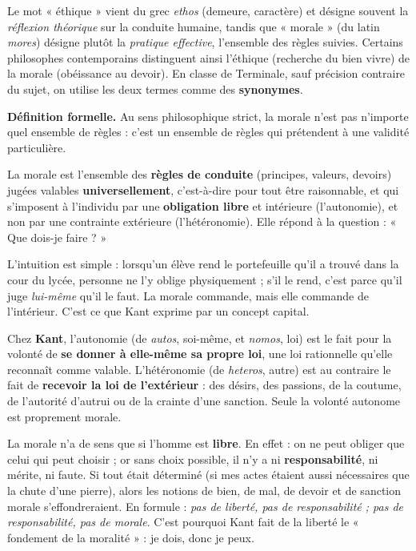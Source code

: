 \documentclass[11pt]{article}
\newcommand{\cle}[1]{{\popxbold\color{popdark}#1}}
\begin{document}
\begin{savaistu}
Le mot « éthique » vient du grec \emph{ethos} (demeure, caractère) et désigne souvent la \emph{réflexion théorique} sur la conduite humaine, tandis que « morale » (du latin \emph{mores}) désigne plutôt la \emph{pratique effective}, l'ensemble des règles suivies. Certains philosophes contemporains distinguent ainsi l'éthique (recherche du bien vivre) de la morale (obéissance au devoir). En classe de Terminale, sauf précision contraire du sujet, on utilise les deux termes comme des \textbf{synonymes}.
\end{savaistu}

\textbf{Définition formelle.} Au sens philosophique strict, la morale n'est pas n'importe quel ensemble de règles : c'est un ensemble de règles qui prétendent à une validité particulière.

\begin{definition}[La morale]
La \cle{morale} est l'ensemble des \textbf{règles de conduite} (principes, valeurs, devoirs) jugées valables \textbf{universellement}, c'est-à-dire pour tout être raisonnable, et qui s'imposent à l'individu par une \textbf{obligation libre} et intérieure (l'\cle{autonomie}), et non par une contrainte extérieure (l'\cle{hétéronomie}). Elle répond à la question : « Que dois-je faire ? »
\end{definition}

L'intuition est simple : lorsqu'un élève rend le portefeuille qu'il a trouvé dans la cour du lycée, personne ne l'y oblige physiquement ; s'il le rend, c'est parce qu'il juge \emph{lui-même} qu'il le faut. La morale commande, mais elle commande de l'intérieur. C'est ce que Kant exprime par un concept capital.

\begin{definition}
Chez \textbf{Kant}, l'\cle{autonomie} (de \emph{autos}, soi-même, et \emph{nomos}, loi) est le fait pour la volonté de \textbf{se donner à elle-même sa propre loi}, une loi rationnelle qu'elle reconnaît comme valable. L'\cle{hétéronomie} (de \emph{heteros}, autre) est au contraire le fait de \textbf{recevoir la loi de l'extérieur} : des désirs, des passions, de la coutume, de l'autorité d'autrui ou de la crainte d'une sanction. Seule la volonté autonome est proprement morale.
\end{definition}

\begin{propriete}
La morale n'a de sens que si l'homme est \textbf{libre}. En effet : on ne peut obliger que celui qui peut choisir ; or sans choix possible, il n'y a ni \textbf{responsabilité}, ni mérite, ni faute. Si tout était déterminé (si mes actes étaient aussi nécessaires que la chute d'une pierre), alors les notions de bien, de mal, de devoir et de sanction morale s'effondreraient. En formule : \emph{pas de liberté, pas de responsabilité ; pas de responsabilité, pas de morale}. C'est pourquoi Kant fait de la liberté le « fondement de la moralité » : je dois, donc je peux.
\end{propriete}
\end{document}
